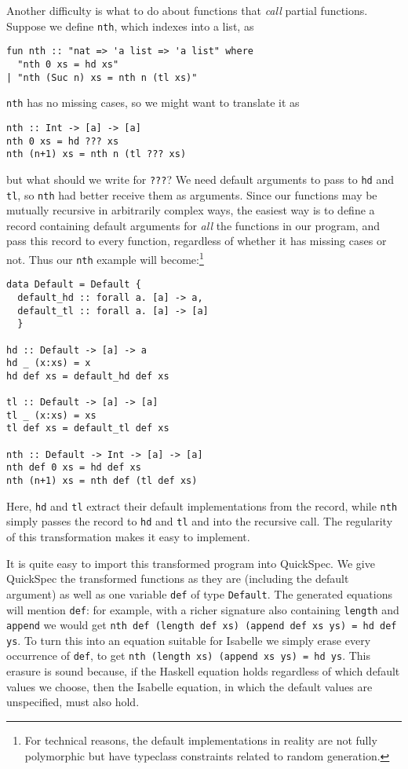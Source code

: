 Another difficulty is what to do about functions that \emph{call} partial functions.
Suppose we define \verb|nth|, which indexes into a list, as
\begin{verbatim}
fun nth :: "nat => 'a list => 'a list" where
  "nth 0 xs = hd xs"
| "nth (Suc n) xs = nth n (tl xs)"
\end{verbatim}

\verb|nth| has no missing cases, so we might want to translate it as
\begin{verbatim}
nth :: Int -> [a] -> [a]
nth 0 xs = hd ??? xs
nth (n+1) xs = nth n (tl ??? xs)
\end{verbatim}
but what should we write for \verb|???|? We need default arguments to
pass to \verb|hd| and \verb|tl|, so \verb|nth| had better receive
them as arguments. Since our functions may be mutually recursive in
arbitrarily complex ways, the easiest way is to define a record
containing default arguments for \emph{all} the functions in our
program, and pass this record to every function, regardless of whether
it has missing cases or not. Thus our \verb|nth| example will become:\footnote{For
technical reasons, the default implementations in reality are not fully
polymorphic but have typeclass constraints related to random generation.}
\begin{verbatim}
data Default = Default {
  default_hd :: forall a. [a] -> a,
  default_tl :: forall a. [a] -> [a]
  }

hd :: Default -> [a] -> a
hd _ (x:xs) = x
hd def xs = default_hd def xs

tl :: Default -> [a] -> [a]
tl _ (x:xs) = xs
tl def xs = default_tl def xs

nth :: Default -> Int -> [a] -> [a]
nth def 0 xs = hd def xs
nth (n+1) xs = nth def (tl def xs)
\end{verbatim}
Here, \verb|hd| and \verb|tl| extract their default implementations
from the record, while \verb|nth| simply passes the record to \verb|hd|
and \verb|tl| and into the recursive call. The regularity of this
transformation makes it easy to implement.

It is quite easy to import this transformed program into QuickSpec.
We give QuickSpec the transformed functions as they are (including the
default argument) as well as one variable \verb|def| of
type \verb|Default|. The generated equations will mention \verb|def|:
for example, with a richer signature also containing
\verb|length| and \verb|append| we would get
\verb|nth def (length def xs) (append def xs ys) = hd def ys|.
To turn this into an equation suitable for Isabelle we simply erase
every occurrence of \verb|def|, to get
\verb|nth (length xs) (append xs ys) = hd ys|.
This erasure is sound because, if the Haskell equation holds
regardless of which default values we choose, then the Isabelle
equation, in which the default values are unspecified, must also hold.
